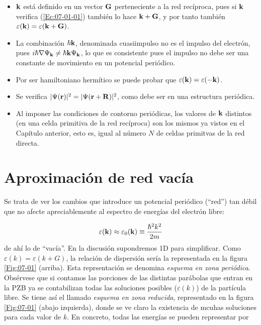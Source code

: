 \begin{itemize}
    \item $\mathbf{k}$ está definido en un vector $\mathbf{G}$ perteneciente a la red recíproca, pues si $\mathbf{k}$ verifica (\ref{Ec:07-01-01}) también lo hace $\mathbf{k} + \mathbf{G}$, y por tanto también $\varepsilon(\mathbf{k})=\varepsilon (\mathbf{k} + \mathbf{G})$. 
    \item La combinación $\hbar \mathbf{k}$, denominada cuasiimpulso no es el impulso del electrón, pues $i\hbar \nabla \Psi_{\mathbf{k}} \neq \hbar \mathbf{k} \Psi_{\mathbf{k}}$, lo que es consistente pues el impulso no debe ser una constante de movimiento en un potencial periódico.
    \item Por ser hamiltoniano hermítico se puede probar que $\varepsilon(\mathbf{k})=\varepsilon(-\mathbf{k})$.
    \item Se verifica $|\Psi (\mathbf{r}) |^2 = |\Psi (\mathbf{r} + \mathbf{R})|^2$, como debe ser en una estructura periódica.
    \item Al imponer las condiciones de contorno periódicas, los valores de $\mathbf{k}$ distintos (en una celda primitiva de la red recíproca) son los mismos ya vistos en el Capítulo anterior, esto es, igual al número $N$ de celdas primitvas de la red directa.
\end{itemize}

\section{Aproximación de red vacía}


Se trata de ver los cambios que introduce un potencial periódico (``red'') tan débil que no afecte apreciablemente al espectro de energías del electrón libre:

\begin{equation}
    \varepsilon (\mathbf{k}) \approx \varepsilon_0 (\mathbf{k}) \equiv \frac{\hbar^2 k^2}{2m}
\end{equation}
de ahí lo de ``vacía''. En la discusión supondremos 1D para simplificar. Como $\varepsilon(k) = \varepsilon(k+G)$, la relación de dispersión sería la representada en la figura \ref{Fig:07-01} (arriba). Esta reprsentación se denomina \textit{esquema en zona periódica}. Obsérvese que si contamos las porciones de las distintas parábolas que entran en la PZB ya se contabilizan todas las soluciones posibles ($\varepsilon(k)$) de la partícula libre. Se tiene así el llamado \textit{esquema en zona reducida}, representado en la figura \ref{Fig:07-01} (abajo izquierda), donde se ve claro la existencia de mcuhas soluciones para cada valor de $k$. En concreto, todas las energías se pueden representar por 

